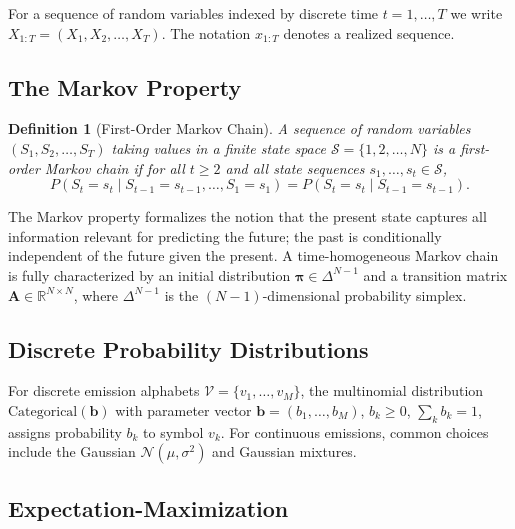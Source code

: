 \documentclass[conference]{IEEEtran}
\newtheorem{definition}{Definition}
\begin{document}
For a sequence of random variables indexed by discrete time $t = 1, \ldots, T$ we write $X_{1:T} = (X_1, X_2, \ldots, X_T)$. The notation $x_{1:T}$ denotes a realized sequence.

\subsection{The Markov Property}

\begin{definition}[First-Order Markov Chain]
A sequence of random variables $(S_1, S_2, \ldots, S_T)$ taking values in a finite state space $\mathcal{S} = \{1, 2, \ldots, N\}$ is a \emph{first-order Markov chain} if for all $t \geq 2$ and all state sequences $s_1, \ldots, s_t \in \mathcal{S}$,
\begin{equation}
P(S_t = s_t \mid S_{t-1} = s_{t-1}, \ldots, S_1 = s_1) = P(S_t = s_t \mid S_{t-1} = s_{t-1}).
\label{eq:markov}
\end{equation}
\end{definition}

The Markov property formalizes the notion that the present state captures all information relevant for predicting the future; the past is conditionally independent of the future given the present. A time-homogeneous Markov chain is fully characterized by an initial distribution $\boldsymbol{\pi} \in \Delta^{N-1}$ and a transition matrix $\mathbf{A} \in \mathbb{R}^{N \times N}$, where $\Delta^{N-1}$ is the $(N-1)$-dimensional probability simplex.

\subsection{Discrete Probability Distributions}

For discrete emission alphabets $\mathcal{V} = \{v_1, \ldots, v_M\}$, the multinomial distribution $\text{Categorical}(\mathbf{b})$ with parameter vector $\mathbf{b} = (b_1, \ldots, b_M)$, $b_k \geq 0$, $\sum_k b_k = 1$, assigns probability $b_k$ to symbol $v_k$. For continuous emissions, common choices include the Gaussian $\mathcal{N}(\mu, \sigma^2)$ and Gaussian mixtures.

\subsection{Expectation-Maximization}
\end{document}
